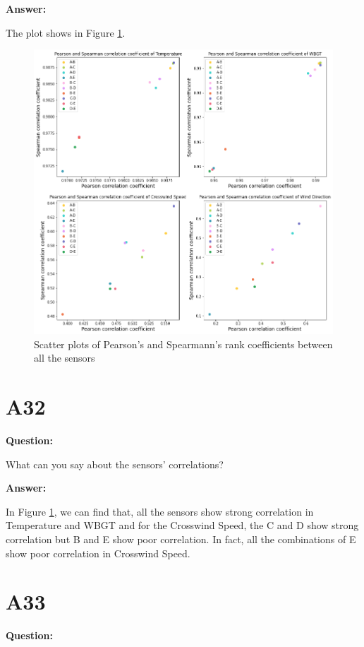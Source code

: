 \documentclass[a4paper]{article}
\numberwithin{figure}{section}
\numberwithin{table}{section}
\begin{document}
\textbf{Answer:}

The plot shows in Figure \ref{Fig:A31}.

\begin{figure}
\centering
\includegraphics[scale=0.4]{Figures/figA31.png}
\caption{Scatter plots of Pearson’s and Spearmann’s rank coefficients between all the sensors}
\label{Fig:A31}
\end{figure}

\section{A32}

\textbf{Question:}

What can you say about the sensors’ correlations?

\textbf{Answer:}

In Figure \ref{Fig:A31}, we can find that, all the sensors show strong correlation in Temperature and WBGT and for the Crosswind Speed, the C and D show strong correlation but B and E show poor correlation. In fact, all the combinations of E show poor correlation in Crosswind Speed.

\section{A33}

\textbf{Question:}
\end{document}
